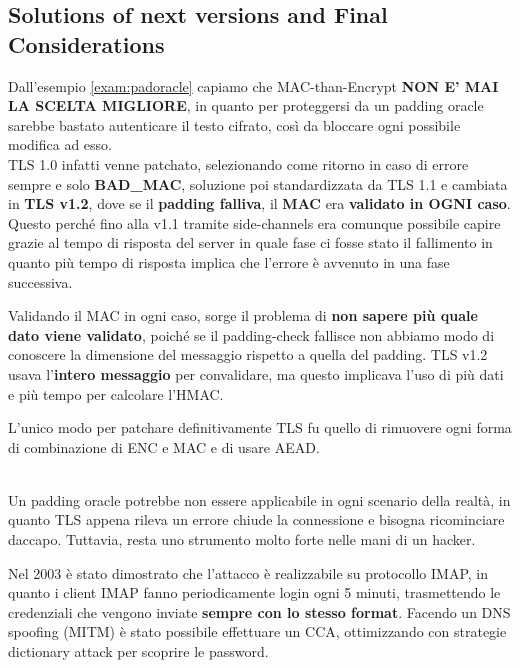 \subsection{Solutions of next versions and Final Considerations}
Dall'esempio \ref{exam:padoracle} capiamo che MAC-than-Encrypt \textbf{NON E' MAI LA SCELTA MIGLIORE}, in quanto per proteggersi da un padding oracle sarebbe bastato autenticare il testo cifrato, così da bloccare ogni possibile modifica ad esso.\\
TLS 1.0 infatti venne patchato, selezionando come ritorno in caso di errore sempre e solo \textbf{BAD\_MAC}, soluzione poi standardizzata da TLS 1.1 e cambiata in \textbf{TLS v1.2}, dove se il \textbf{padding falliva}, il \textbf{MAC} era \textbf{validato in OGNI caso}.
Questo perché fino alla v1.1 tramite side-channels era comunque possibile capire grazie al tempo di risposta del server in quale fase ci fosse stato il fallimento in quanto più tempo di risposta implica che l'errore è avvenuto in una fase successiva.\\
\begin{corollary}
Validando il MAC in ogni caso, sorge il problema di \textbf{non sapere più quale dato viene validato}, poiché se il padding-check fallisce non abbiamo modo di conoscere la dimensione del messaggio rispetto a quella del padding. TLS v1.2 usava l'\textbf{intero messaggio} per convalidare, ma questo implicava l'uso di più dati e più tempo per calcolare l'HMAC.
\end{corollary}
\begin{note}
L'unico modo per patchare definitivamente TLS fu quello di rimuovere ogni forma di combinazione di ENC e MAC e di usare AEAD.
\end{note}
\begin{proposition}\hfill\\
Un padding oracle potrebbe non essere applicabile in ogni scenario della realtà, in quanto TLS appena rileva un errore chiude la connessione e bisogna ricominciare daccapo. Tuttavia, resta uno strumento molto forte nelle mani di un hacker.
\end{proposition}
Nel 2003 è stato dimostrato che l'attacco è realizzabile su protocollo IMAP, in quanto i client IMAP fanno periodicamente login ogni 5 minuti, trasmettendo le credenziali che vengono inviate \textbf{sempre con lo stesso format}. Facendo un DNS spoofing (MITM) è stato possibile effettuare un CCA, ottimizzando con strategie dictionary attack per scoprire le password.
